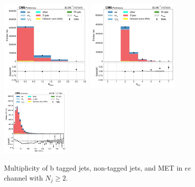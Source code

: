 \begin{figure}[htb!]
    \centering
    \includegraphics[width=0.4\textwidth]{chapters/Analysis/sectionPlots/figures/data_mc_overlays/ee_2016_inclusive_linear_jet_n_bjets}
    \includegraphics[width=0.4\textwidth]{chapters/Analysis/sectionPlots/figures/data_mc_overlays/ee_2016_inclusive_linear_jet_n_jets}
    \includegraphics[width=0.3\textwidth]{chapters/Analysis/sectionPlots/figures/data_mc_overlays/ee_2016_inclusive_linear_misc_met_mag}
    \caption{Multiplicity of b tagged jets, non-tagged jets, and MET in
    $ee$ channel with $N_{j} \geq 2$.}
    \label{fig:analysis:plots:ee_jetmet}
\end{figure}


